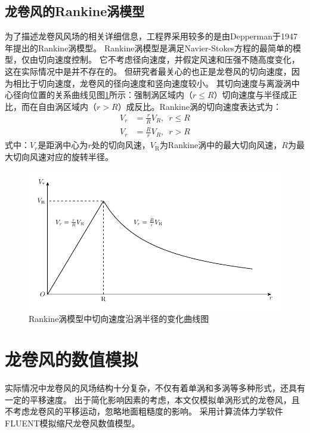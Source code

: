 \subsection{龙卷风的Rankine涡模型}
为了描述龙卷风风场的相关详细信息，工程界采用较多的是由Depperman\cite{Depperman1947}于1947年提出的Rankine涡模型。
Rankine涡模型是满足Navier-Stokes方程的最简单的模型，仅由切向速度控制。
它不考虑径向速度，并假定风速和压强不随高度变化，这在实际情况中是并不存在的。
但研究者最关心的也正是龙卷风的切向速度，因为相比于切向速度，龙卷风的径向速度和竖向速度较小。
其切向速度与离漩涡中心径向位置的关系曲线见图\ref{fig:Rankine}所示：强制涡区域内（$r\leq R$）切向速度与半径成正比，而在自由涡区域内（$r > R$）成反比。Rankine涡的切向速度表达式为\cite{Commission2007}：
\begin{equation}
\label{eqn:Rankine}
\begin{split}
    V_r &= \frac{r}{R} V_R,  \,\,\, r \leq R \\
    V_r &= \frac{R}{r} V_R,  \,\,\, r > R
\end{split}
\end{equation}
式中：$V_r$是距涡中心为$r$处的切向风速，$V_{\mathrm{R}}$为Rankine涡中的最大切向风速，$R$为最大切向风速对应的旋转半径。
\begin{figure}[!htbp]
\centering
\includegraphics{tornado-simulation/fig/Rankine.pdf}
\caption{Rankine涡模型中切向速度沿涡半径的变化曲线图}
\label{fig:Rankine}
\end{figure}



\section{龙卷风的数值模拟}
实际情况中龙卷风的风场结构十分复杂，不仅有着单涡和多涡等多种形式，还具有一定的平移速度。
出于简化影响因素的考虑，本文仅模拟单涡形式的龙卷风，且不考虑龙卷风的平移运动，忽略地面粗糙度的影响。
采用计算流体力学软件FLUENT模拟缩尺龙卷风数值模型。


